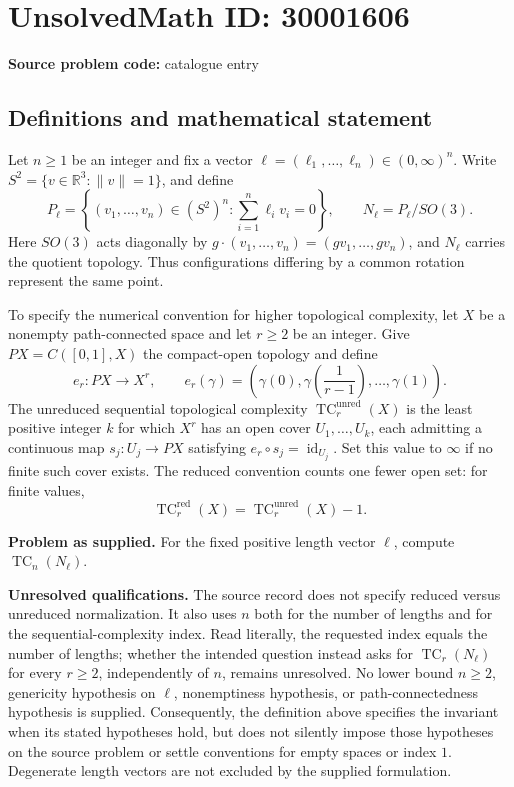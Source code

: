 \documentclass[11pt]{article}
\newcommand{\R}{\mathbb{R}}
\begin{document}
\section*{UnsolvedMath ID: 30001606}
\textbf{Source problem code:} catalogue entry
\subsection{Definitions and mathematical statement}
Let \(n\geq 1\) be an integer and fix a vector \(\ell=(\ell_1,\ldots,\ell_n)\in(0,\infty)^n\). Write \(S^2=\{v\in\R^3:\|v\|=1\}\), and define
\[
 P_\ell=\left\{(v_1,\ldots,v_n)\in(S^2)^n:\sum_{i=1}^n\ell_i v_i=0\right\},\qquad N_\ell=P_\ell/SO(3).
\]
Here \(SO(3)\) acts diagonally by \(g\cdot(v_1,\ldots,v_n)=(gv_1,\ldots,gv_n)\), and \(N_\ell\) carries the quotient topology. Thus configurations differing by a common rotation represent the same point.

To specify the numerical convention for higher topological complexity, let \(X\) be a nonempty path-connected space and let \(r\geq2\) be an integer. Give \(PX=C([0,1],X)\) the compact-open topology and define
\[
 e_r:PX\longrightarrow X^r,\qquad e_r(\gamma)=\left(\gamma(0),\gamma\!\left(\frac1{r-1}\right),\ldots,\gamma(1)\right).
\]
The unreduced sequential topological complexity \(\operatorname{TC}^{\mathrm{unred}}_r(X)\) is the least positive integer \(k\) for which \(X^r\) has an open cover \(U_1,\ldots,U_k\), each admitting a continuous map \(s_j:U_j\to PX\) satisfying \(e_r\circ s_j=\operatorname{id}_{U_j}\). Set this value to \(\infty\) if no finite such cover exists. The reduced convention counts one fewer open set: for finite values,
\[
 \operatorname{TC}^{\mathrm{red}}_r(X)=\operatorname{TC}^{\mathrm{unred}}_r(X)-1.
\]

\textbf{Problem as supplied.} For the fixed positive length vector \(\ell\), compute \(\operatorname{TC}_n(N_\ell)\).

\textbf{Unresolved qualifications.} The source record does not specify reduced versus unreduced normalization. It also uses \(n\) both for the number of lengths and for the sequential-complexity index. Read literally, the requested index equals the number of lengths; whether the intended question instead asks for \(\operatorname{TC}_r(N_\ell)\) for every \(r\geq2\), independently of \(n\), remains unresolved. No lower bound \(n\geq2\), genericity hypothesis on \(\ell\), nonemptiness hypothesis, or path-connectedness hypothesis is supplied. Consequently, the definition above specifies the invariant when its stated hypotheses hold, but does not silently impose those hypotheses on the source problem or settle conventions for empty spaces or index \(1\). Degenerate length vectors are not excluded by the supplied formulation.
\end{document}
